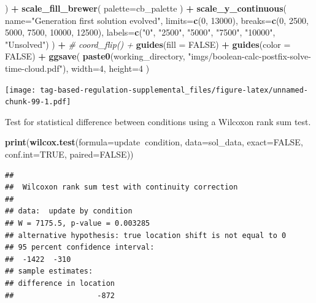 \documentclass[]{book}
\newenvironment{Shaded}{\begin{snugshade}}{\end{snugshade}}
\newcommand{\CommentTok}[1]{\textcolor[rgb]{0.56,0.35,0.01}{\textit{#1}}}
\newcommand{\DataTypeTok}[1]{\textcolor[rgb]{0.13,0.29,0.53}{#1}}
\newcommand{\DecValTok}[1]{\textcolor[rgb]{0.00,0.00,0.81}{#1}}
\newcommand{\KeywordTok}[1]{\textcolor[rgb]{0.13,0.29,0.53}{\textbf{#1}}}
\newcommand{\NormalTok}[1]{#1}
\newcommand{\OperatorTok}[1]{\textcolor[rgb]{0.81,0.36,0.00}{\textbf{#1}}}
\newcommand{\OtherTok}[1]{\textcolor[rgb]{0.56,0.35,0.01}{#1}}
\newcommand{\StringTok}[1]{\textcolor[rgb]{0.31,0.60,0.02}{#1}}
\begin{document}
\begin{Shaded}
\begin{Highlighting}[]
\NormalTok{  ) }\OperatorTok{+}
\StringTok{  }\KeywordTok{scale_fill_brewer}\NormalTok{(}
    \DataTypeTok{palette=}\NormalTok{cb_palette}
\NormalTok{  ) }\OperatorTok{+}
\StringTok{  }\KeywordTok{scale_y_continuous}\NormalTok{(}
    \DataTypeTok{name=}\StringTok{"Generation first solution evolved"}\NormalTok{,}
    \DataTypeTok{limits=}\KeywordTok{c}\NormalTok{(}\DecValTok{0}\NormalTok{, }\DecValTok{13000}\NormalTok{),}
    \DataTypeTok{breaks=}\KeywordTok{c}\NormalTok{(}\DecValTok{0}\NormalTok{, }\DecValTok{2500}\NormalTok{, }\DecValTok{5000}\NormalTok{, }\DecValTok{7500}\NormalTok{, }\DecValTok{10000}\NormalTok{, }\DecValTok{12500}\NormalTok{),}
    \DataTypeTok{labels=}\KeywordTok{c}\NormalTok{(}\StringTok{"0"}\NormalTok{, }\StringTok{"2500"}\NormalTok{, }\StringTok{"5000"}\NormalTok{, }\StringTok{"7500"}\NormalTok{, }\StringTok{"10000"}\NormalTok{, }\StringTok{"Unsolved"}\NormalTok{)}
\NormalTok{  ) }\OperatorTok{+}
\StringTok{  }\CommentTok{# coord_flip() +}
\StringTok{  }\KeywordTok{guides}\NormalTok{(}\DataTypeTok{fill =} \OtherTok{FALSE}\NormalTok{) }\OperatorTok{+}
\StringTok{  }\KeywordTok{guides}\NormalTok{(}\DataTypeTok{color =} \OtherTok{FALSE}\NormalTok{) }\OperatorTok{+}
\StringTok{  }\KeywordTok{ggsave}\NormalTok{(}
    \KeywordTok{paste0}\NormalTok{(working_directory, }\StringTok{"imgs/boolean-calc-postfix-solve-time-cloud.pdf"}\NormalTok{),}
    \DataTypeTok{width=}\DecValTok{4}\NormalTok{,}
    \DataTypeTok{height=}\DecValTok{4}
\NormalTok{  )}
\end{Highlighting}
\end{Shaded}

\texttt{[image: tag-based-regulation-supplemental\_files/figure-latex/unnamed-chunk-99-1.pdf]}

Test for statistical difference between conditions using a Wilcoxon rank sum test.

\begin{Shaded}
\begin{Highlighting}[]
\KeywordTok{print}\NormalTok{(}\KeywordTok{wilcox.test}\NormalTok{(}\DataTypeTok{formula=}\NormalTok{update}\OperatorTok{~}\NormalTok{condition, }\DataTypeTok{data=}\NormalTok{sol_data, }\DataTypeTok{exact=}\OtherTok{FALSE}\NormalTok{, }\DataTypeTok{conf.int=}\OtherTok{TRUE}\NormalTok{, }\DataTypeTok{paired=}\OtherTok{FALSE}\NormalTok{))}
\end{Highlighting}
\end{Shaded}

\begin{verbatim}
## 
##  Wilcoxon rank sum test with continuity correction
## 
## data:  update by condition
## W = 7175.5, p-value = 0.003285
## alternative hypothesis: true location shift is not equal to 0
## 95 percent confidence interval:
##  -1422  -310
## sample estimates:
## difference in location 
##                   -872
\end{verbatim}
\end{document}
